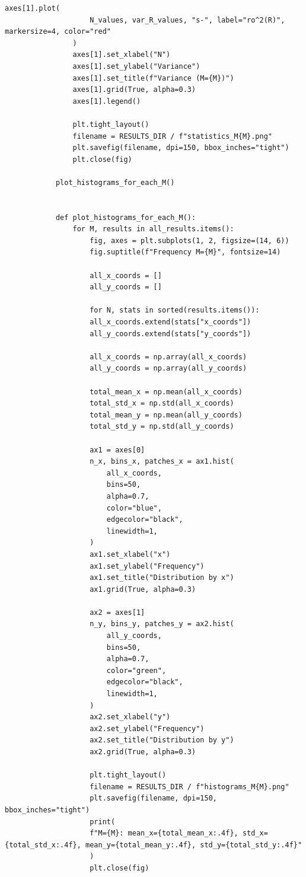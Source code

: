 \documentclass[14pt,a4paper]{extarticle}
\theoremstyle{plain}
\begin{document}
\begin{lstlisting}[title=main.py, gobble=16, breaklines=true, showspaces=false, showtabs=false, breakatwhitespace=true]
				axes[1].plot(
					N_values, var_R_values, "s-", label="ro^2(R)", markersize=4, color="red"
				)
				axes[1].set_xlabel("N")
				axes[1].set_ylabel("Variance")
				axes[1].set_title(f"Variance (M={M})")
				axes[1].grid(True, alpha=0.3)
				axes[1].legend()
				
				plt.tight_layout()
				filename = RESULTS_DIR / f"statistics_M{M}.png"
				plt.savefig(filename, dpi=150, bbox_inches="tight")
				plt.close(fig)
			
			plot_histograms_for_each_M()
			
			
			def plot_histograms_for_each_M():
				for M, results in all_results.items():
					fig, axes = plt.subplots(1, 2, figsize=(14, 6))
					fig.suptitle(f"Frequency M={M}", fontsize=14)
					
					all_x_coords = []
					all_y_coords = []
					
					for N, stats in sorted(results.items()):
					all_x_coords.extend(stats["x_coords"])
					all_y_coords.extend(stats["y_coords"])
					
					all_x_coords = np.array(all_x_coords)
					all_y_coords = np.array(all_y_coords)
					
					total_mean_x = np.mean(all_x_coords)
					total_std_x = np.std(all_x_coords)
					total_mean_y = np.mean(all_y_coords)
					total_std_y = np.std(all_y_coords)
					
					ax1 = axes[0]
					n_x, bins_x, patches_x = ax1.hist(
						all_x_coords,
						bins=50,
						alpha=0.7,
						color="blue",
						edgecolor="black",
						linewidth=1,
					)
					ax1.set_xlabel("x")
					ax1.set_ylabel("Frequency")
					ax1.set_title("Distribution by x")
					ax1.grid(True, alpha=0.3)
					
					ax2 = axes[1]
					n_y, bins_y, patches_y = ax2.hist(
						all_y_coords,
						bins=50,
						alpha=0.7,
						color="green",
						edgecolor="black",
						linewidth=1,
					)
					ax2.set_xlabel("y")
					ax2.set_ylabel("Frequency")
					ax2.set_title("Distribution by y")
					ax2.grid(True, alpha=0.3)
					
					plt.tight_layout()
					filename = RESULTS_DIR / f"histograms_M{M}.png"
					plt.savefig(filename, dpi=150, bbox_inches="tight")
					print(
					f"M={M}: mean_x={total_mean_x:.4f}, std_x={total_std_x:.4f}, mean_y={total_mean_y:.4f}, std_y={total_std_y:.4f}"
					)
					plt.close(fig)
		
	\end{lstlisting}
	
\end{document}
